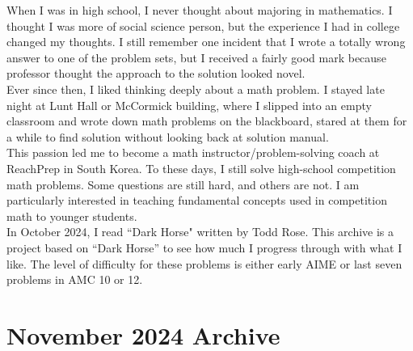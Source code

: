 \documentclass[12pt]{article}
\begin{document}
\begin{flushleft}
When I was in high school, I never thought about majoring in mathematics. I thought I was more of social science person, but the experience I had in college changed my thoughts. I still remember one incident that I wrote a totally wrong answer to one of the problem sets, but I received a fairly good mark because professor thought the approach to the solution looked novel.\\
\bigskip
Ever since then, I liked thinking deeply about a math problem. I stayed late night at Lunt Hall or McCormick building, where I slipped into an empty classroom and wrote down math problems on the blackboard, stared at them for a while to find solution without looking back at solution manual.\\
\bigskip
This passion led me to become a math instructor/problem-solving coach at ReachPrep in South Korea. To these days, I still solve high-school competition math problems. Some questions are still hard, and others are not. I am particularly interested in teaching fundamental concepts used in competition math to younger students.\\
\bigskip
In October 2024, I read ``Dark Horse" written by Todd Rose. This archive is a project based on ``Dark Horse'' to see how much I progress through with what I like. The level of difficulty for these problems is either early AIME or last seven problems in AMC 10 or 12.\\
\newpage


\section*{November 2024 Archive}





\end{flushleft}
\end{document}
